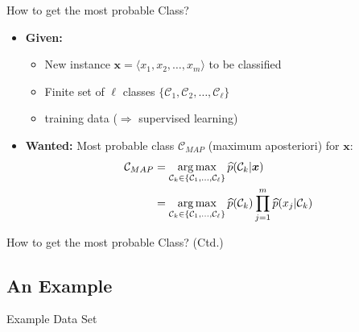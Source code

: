 \begin{frame}{How to get the most probable Class?}{}
	\begin{itemize}
		\item \textbf{Given:}
		\begin{itemize}
			\item New instance $\bm{x} = \langle x_1, x_2, \dots, x_m \rangle$ to be classified
			\item Finite set of $\ell$ classes $\{ \mathcal{C}_1, \mathcal{C}_2, \dots, \mathcal{C}_\ell \}$
			\item {} training data ($\Rightarrow$ supervised learning)
		\end{itemize}
		\item \textbf{Wanted:} Most probable class $\mathcal{C}_{MAP}$ (maximum aposteriori) for $\bm{x}$:
		\begin{align}
			\mathcal{C}_{MAP}
				&= \operatorname*{arg\,max}_{\mathcal{C}_k \in \{ \mathcal{C}_1, \dots, \mathcal{C}_\ell \}} 
					\widehat{p}(\mathcal{C}_k \vert \bm{x}) \\
				&= \operatorname*{arg\,max}_{\mathcal{C}_k \in \{ \mathcal{C}_1, \dots, \mathcal{C}_\ell \}} 
					\widehat{p}(\mathcal{C}_k) \prod_{j=1}^m \widehat{p}(x_j \vert \mathcal{C}_k)
		\end{align}
	\end{itemize}
\end{frame}


\begin{frame}{How to get the most probable Class? (Ctd.)}{}
	\vspace*{-2mm}
	
\end{frame}


\subsection{An Example}

\begin{frame}{Example Data Set}{}
	
\end{frame}



